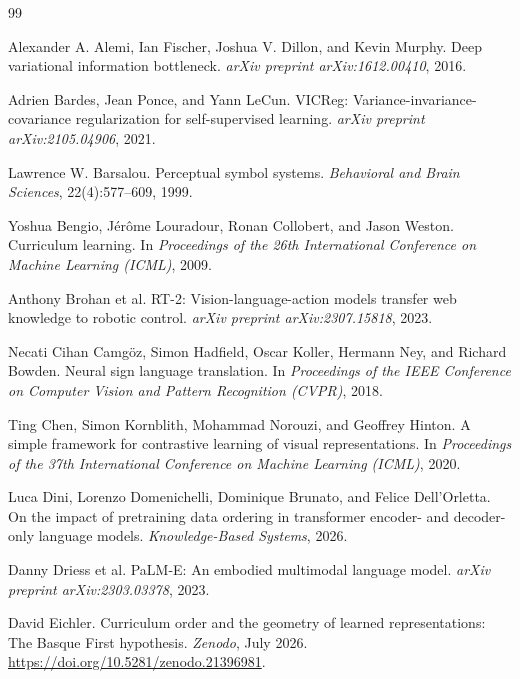 \documentclass[11pt]{article}
\begin{document}
\begin{thebibliography}{99}

Alexander A. Alemi, Ian Fischer, Joshua V. Dillon, and Kevin Murphy.
\newblock Deep variational information bottleneck.
\newblock \emph{arXiv preprint arXiv:1612.00410}, 2016.

Adrien Bardes, Jean Ponce, and Yann LeCun.
\newblock VICReg: Variance-invariance-covariance regularization for self-supervised learning.
\newblock \emph{arXiv preprint arXiv:2105.04906}, 2021.

Lawrence W. Barsalou.
\newblock Perceptual symbol systems.
\newblock \emph{Behavioral and Brain Sciences}, 22(4):577--609, 1999.

Yoshua Bengio, J\'{e}r\^{o}me Louradour, Ronan Collobert, and Jason Weston.
\newblock Curriculum learning.
\newblock In \emph{Proceedings of the 26th International Conference on Machine Learning (ICML)}, 2009.

Anthony Brohan et al.
\newblock RT-2: Vision-language-action models transfer web knowledge to robotic control.
\newblock \emph{arXiv preprint arXiv:2307.15818}, 2023.

Necati Cihan Camg\"{o}z, Simon Hadfield, Oscar Koller, Hermann Ney, and Richard Bowden.
\newblock Neural sign language translation.
\newblock In \emph{Proceedings of the IEEE Conference on Computer Vision and Pattern Recognition (CVPR)}, 2018.

Ting Chen, Simon Kornblith, Mohammad Norouzi, and Geoffrey Hinton.
\newblock A simple framework for contrastive learning of visual representations.
\newblock In \emph{Proceedings of the 37th International Conference on Machine Learning (ICML)}, 2020.

Luca Dini, Lorenzo Domenichelli, Dominique Brunato, and Felice Dell'Orletta.
\newblock On the impact of pretraining data ordering in transformer encoder- and decoder-only language models.
\newblock \emph{Knowledge-Based Systems}, 2026.

Danny Driess et al.
\newblock PaLM-E: An embodied multimodal language model.
\newblock \emph{arXiv preprint arXiv:2303.03378}, 2023.

David Eichler.
\newblock Curriculum order and the geometry of learned representations: The Basque First hypothesis.
\newblock \emph{Zenodo}, July 2026.
\newblock \url{https://doi.org/10.5281/zenodo.21396981}.


\end{thebibliography}
\end{document}
